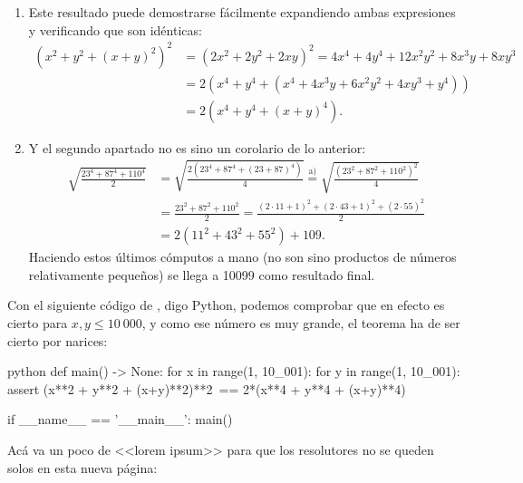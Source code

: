 \documentclass[
	fecha={5 de agosto de 2025},
	palabrasclave={RetoSecundaria, ago2025, álgebra, dif1},
	codigo=minted
]{RetoMatematico}
\begin{document}
\forma
\begin{enumerate}[label=\emph{\alph*})]
\item Este resultado puede demostrarse fácilmente expandiendo ambas expresiones y verificando que son idénticas: \begin{align*}
    \left(x^2 + y^2 + (x+y)^2\right)^2 &= \left(2x^2 + 2y^2 + 2xy\right)^2 = 4x^4 + 4y^4 + 12x^2y^2 + 8x^3y + 8xy^3\\
    &= 2(x^4 + y^4 + (x^4 + 4x^3 y + 6x^2y^2 + 4 xy^3 + y^4))\\
	&= 2(x^4 + y^4 + (x+y)^4).
\end{align*}
\item Y el segundo apartado no es sino un corolario de lo anterior: \begin{align*}
    \sqrt{\frac{23^4 + 87^4 + 110^4}{2}} &= \sqrt{\frac{2(23^4 + 87^4 + (23+87)^4)}{4}} \stackrel{\text{a)}}{=} \sqrt{\frac{\left(23^2 + 87^2 + 110^2\right)^2}{4}}\\
	&= \frac{23^2 + 87^2 + 110^2}{2} = \frac{(2\cdot 11 + 1)^2 + (2\cdot 43 + 1)^2 + (2\cdot 55)^2}{2}\\
	&= 2(11^2 + 43^2 + 55^2) + 109.
\end{align*} Haciendo estos últimos cómputos a mano (no son sino productos de números relativamente pequeños) se llega a 10099 como resultado final.
\end{enumerate}

Con el siguiente código de \mathematica, digo Python, podemos comprobar que en efecto es cierto para $x,y\leq 10\ 000$, y como ese número es muy grande, el teorema ha de ser cierto por narices:
\begin{codigo}{python}
def main() -> None:
	for x in range(1, 10_001):
		for y in range(1, 10_001):
			assert (x**2 + y**2 + (x+y)**2)**2\
			    == 2*(x**4 + y**4 + (x+y)**4)

if __name__ == '__main__': main()
\end{codigo}

Acá va un poco de <<lorem ipsum>> para que los resolutores no se queden solos en esta nueva página:

\lipsum[1-4]

\end{document}
